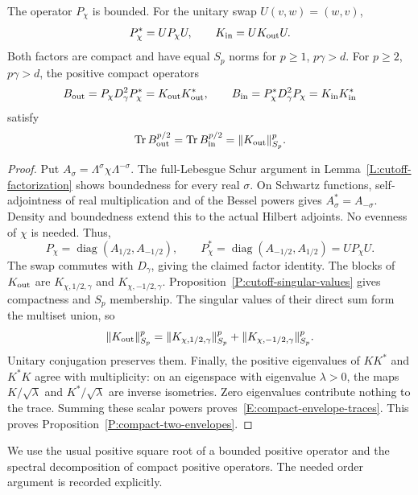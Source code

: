 \begin{proposition}\label{P:compact-two-envelopes}
  The operator $P_\chi$ is bounded. For the unitary swap $U(v,w)=(w,v)$,
  \[
    P_\chi^*=UP_\chi U,\qquad K_{\rm in}=UK_{\rm out}U.
  \]
  Both factors are compact and have equal $S_p$ norms for $p \ge 1$,
  $p\gamma>d$. For $p \ge 2$, $p\gamma>d$, the positive compact operators
  \[
    B_{\rm out}=P_\chi D_\gamma^2P_\chi^*=K_{\rm out}K_{\rm out}^*,
    \qquad B_{\rm in}=P_\chi^*D_\gamma^2P_\chi=K_{\rm in}K_{\rm in}^*
  \]
  satisfy
  \begin{equation}\label{E:compact-envelope-traces}
    \operatorname{Tr}B_{\rm out}^{p/2}
    =\operatorname{Tr}B_{\rm in}^{p/2}=\|K_{\rm out}\|_{S_p}^p.
  \end{equation}
\end{proposition}

\begin{proof}
  Put $A_\sigma=\Lambda^\sigma\chi\Lambda^{-\sigma}$.
  The full-Lebesgue Schur argument in Lemma~\ref{L:cutoff-factorization}
  shows boundedness for every real $\sigma$. On Schwartz functions,
  self-adjointness of real multiplication and of the Bessel powers gives
  $A_\sigma^*=A_{-\sigma}$. Density and boundedness extend this to the
  actual Hilbert adjoints. No evenness of $\chi$ is needed. Thus,
  \[
    P_\chi=\operatorname{diag}(A_{1/2},A_{-1/2}),\qquad
    P_\chi^*=\operatorname{diag}(A_{-1/2},A_{1/2})=UP_\chi U.
  \]
  The swap commutes with $D_\gamma$, giving the claimed factor identity.
  The blocks of $K_{\rm out}$ are $K_{\chi,1/2,\gamma}$ and
  $K_{\chi,-1/2,\gamma}$. Proposition~\ref{P:cutoff-singular-values}
  gives compactness and $S_p$ membership. The singular values of their
  direct sum form the multiset union, so
  \[
    \|K_{\rm out}\|_{S_p}^p
    =\|K_{\chi,1/2,\gamma}\|_{S_p}^p+
    \|K_{\chi,-1/2,\gamma}\|_{S_p}^p.
  \]
  Unitary conjugation preserves them. Finally, the positive eigenvalues
  of $KK^*$ and $K^*K$ agree with multiplicity: on an eigenspace with
  eigenvalue $\lambda>0$, the maps $K/\sqrt\lambda$ and $K^*/\sqrt\lambda$
  are inverse isometries. Zero eigenvalues contribute nothing to the trace.
  Summing these scalar powers proves~\eqref{E:compact-envelope-traces}.
  This proves Proposition~\ref{P:compact-two-envelopes}.
\end{proof}

We use the usual positive square root of a bounded positive operator and
the spectral decomposition of compact positive operators. The needed
order argument is recorded explicitly.


